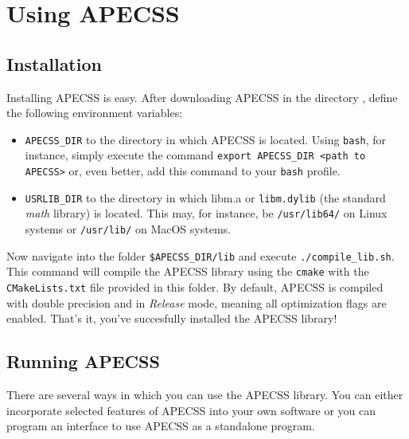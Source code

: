 \chapter{Using APECSS}

\section{Installation}
\label{sec:installation}

Installing APECSS is easy. After downloading APECSS in the directory {\tt <path to APECSS>}, define the following environment variables:\vspace{-1em}
\begin{itemize}[noitemsep]
\item {\tt APECSS\_DIR} to the directory in which APECSS is located. Using {\tt bash}, for instance, simply execute the command {\tt export APECSS\_DIR <path to APECSS>} or, even better, add this command to your {\tt bash} profile.
\item {\tt USRLIB\_DIR} to the directory in which libm.a or {\tt libm.dylib} (the standard \textit{math} library) is located. This may, for instance, be {\tt /usr/lib64/} on Linux systems or {\tt /usr/lib/} on MacOS systems.
\end{itemize}

Now navigate into the folder {\tt \$APECSS\_DIR/lib} and execute {\tt ./compile\_lib.sh}. This command will compile the APECSS library using the {\tt cmake} with the {\tt CMakeLists.txt} file provided in this folder. By default, APECSS is compiled with double precision and in \textit{Release} mode, meaning all optimization flags are enabled. That's it, you've succesfully installed the APECSS library!

\section{Running APECSS}

There are several ways in which you can use the APECSS library. You can either incorporate selected features of APECSS into your own software or you can program an interface to use APECSS as a standalone program. 

